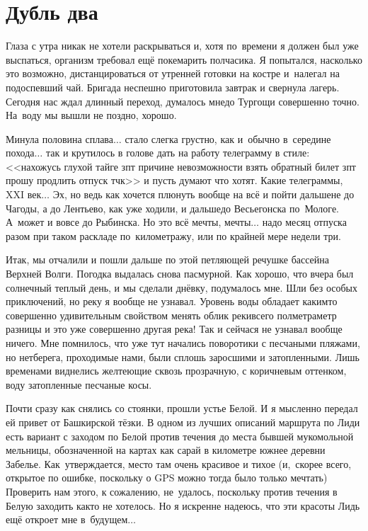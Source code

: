 \chapter{Дубль два} 
\vepsianrose

Глаза с утра никак не хотели раскрываться и, хотя по~времени я должен был уже выспаться, организм требовал ещё покемарить полчасика. Я попытался, насколько это возможно, дистанцироваться от утренней готовки на костре и~налегал на подоспевший чай. Бригада неспешно приготовила завтрак и свернула лагерь. Сегодня нас ждал длинный переход, думалось мне\mdash до Тургощи совершенно точно. На~воду мы вышли не поздно, хорошо.  

Минула половина сплава$\ldots$ стало слегка грустно, как и~обычно в~середине похода$\ldots$ так и крутилось в голове дать на работу телеграмму в стиле: <<нахожусь глухой тайге зпт причине невозможности взять обратный билет зпт прошу продлить отпуск тчк>> и пусть думают что хотят. Какие телеграммы, XXI век$\ldots$ Эх, но ведь как хочется плюнуть вообще на всё и пойти дальше\mdash не до Чагоды, а до Лентьево, как уже ходили, и дальше\mdash до Весьегонска по~Мологе. А~может и вовсе до Рыбинска. Но это всё мечты, мечты$\ldots$ надо месяц отпуска разом при таком раскладе по~километражу, или по крайней мере недели три.

Итак, мы отчалили и пошли дальше по этой петляющей речушке бассейна Верхней Волги. Погодка выдалась снова пасмурной. Как хорошо, что вчера был солнечный теплый день, и мы сделали днёвку, подумалось мне. Шли без особых приключений, но реку я вообще не узнавал. Уровень воды обладает каким\sdash то совершенно удивительным свойством менять облик реки\mdash всего полметра\sdash метр разницы и это уже совершенно другая река! Так и сейчас\mdash я не узнавал вообще ничего. Мне помнилось, что уже тут начались поворотики с песчаными пляжами, но нет\mdash берега, проходимые нами, были сплошь заросшими и затопленными. Лишь временами виднелись желтеющие сквозь прозрачную, с коричневым оттенком, воду затопленные песчаные косы.

Почти сразу как снялись со стоянки, прошли устье Белой. И я мысленно передал ей привет от Башкирской тёзки. В одном из лучших описаний маршрута по Лиди есть вариант с заходом по Белой против течения до места бывшей мукомольной мельницы, обозначенной на картах как сарай в километре южнее деревни Забелье\cite{КатераиЯхтыЛидь}. Как~утверждается, место там очень красивое и тихое (и,~скорее всего, открытое по ошибке, поскольку о GPS можно тогда было только мечтать) Проверить нам этого, к сожалению, не~удалось, поскольку против течения в Белую заходить как\sdash то не хотелось. Но я искренне надеюсь, что эти красоты Лидь ещё откроет мне в~будущем$\ldots$


